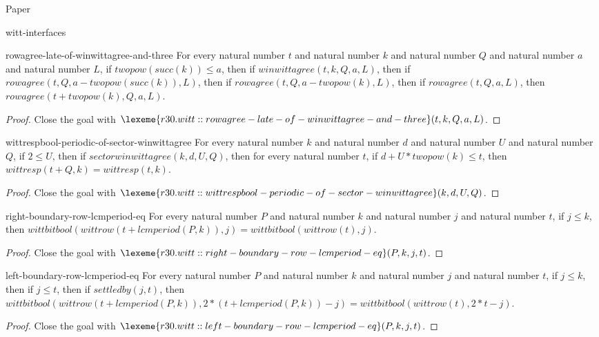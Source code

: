 \begin{lexlean}{Paper}
\begin{section}{witt-interfaces}
  \begin{theorem}{rowagree-late-of-winwittagree-and-three}
  For every natural number \(t\) and natural number \(k\) and natural number \(Q\) and natural number \(a\) and natural number \(L\), if \(twopow(succ(k)) ≤ a\), then if \(winwittagree(t, k, Q, a, L)\), then if \(rowagree(t, Q, a - twopow(succ(k)), L)\), then if \(rowagree(t, Q, a - twopow(k), L)\), then if \(rowagree(t, Q, a, L)\), then \(rowagree(t + twopow(k), Q, a, L)\).
  \begin{proof}
  Close the goal with \(\lexeme{r30.witt::rowagree-late-of-winwittagree-and-three}(t, k, Q, a, L)\).
  \end{proof}
  \end{theorem}

  \begin{theorem}{wittrespbool-periodic-of-sector-winwittagree}
  For every natural number \(k\) and natural number \(d\) and natural number \(U\) and natural number \(Q\), if \(2 ≤ U\), then if \(sectorwinwittagree(k, d, U, Q)\), then for every natural number \(t\), if \(d + U * twopow(k) ≤ t\), then \(wittresp(t + Q, k) = wittresp(t, k)\).
  \begin{proof}
  Close the goal with \(\lexeme{r30.witt::wittrespbool-periodic-of-sector-winwittagree}(k, d, U, Q)\).
  \end{proof}
  \end{theorem}

  \begin{theorem}{right-boundary-row-lcmperiod-eq}
  For every natural number \(P\) and natural number \(k\) and natural number \(j\) and natural number \(t\), if \(j ≤ k\), then \(wittbitbool(wittrow(t + lcmperiod(P, k)), j) = wittbitbool(wittrow(t), j)\).
  \begin{proof}
  Close the goal with \(\lexeme{r30.witt::right-boundary-row-lcmperiod-eq}(P, k, j, t)\).
  \end{proof}
  \end{theorem}

  \begin{theorem}{left-boundary-row-lcmperiod-eq}
  For every natural number \(P\) and natural number \(k\) and natural number \(j\) and natural number \(t\), if \(j ≤ k\), then if \(j ≤ t\), then if \(settledby(j, t)\), then \(wittbitbool(wittrow(t + lcmperiod(P, k)), 2 * (t + lcmperiod(P, k)) - j) = wittbitbool(wittrow(t), 2 * t - j)\).
  \begin{proof}
  Close the goal with \(\lexeme{r30.witt::left-boundary-row-lcmperiod-eq}(P, k, j, t)\).
  \end{proof}
  \end{theorem}


\end{section}
\end{lexlean}
